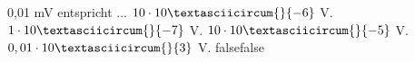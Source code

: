     {0,01 mV entspricht ...}
    {$10\cdot 10\textasciicircum{}\{-6\}$ V.}
    {$1\cdot 10\textasciicircum{}\{-7\}$ V.}
    {$10\cdot 10\textasciicircum{}\{-5\}$ V.}
    {$0,01\cdot 10\textasciicircum{}\{3\}$ V.}
    {false}{false}